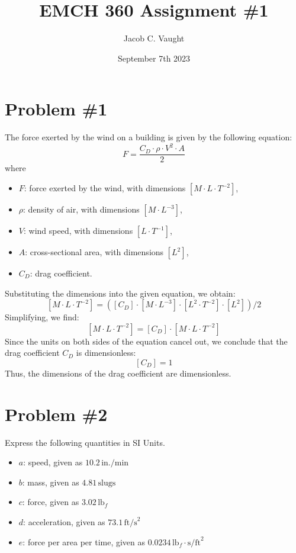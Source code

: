 \documentclass{article}
\title{EMCH 360 Assignment \#1}
\author{Jacob C. Vaught}
\date{September 7th 2023}
\begin{document}
\maketitle

\section*{Problem \#1}
The force exerted by the wind on a building is given by the following equation:
\[
F = \frac{{C_D \cdot \rho \cdot V^2 \cdot A}}{2}
\]
where
\begin{itemize}
\item \( F \): force exerted by the wind, with dimensions \([M \cdot L \cdot T^{-2}]\),
\item \( \rho \): density of air, with dimensions \([M \cdot L^{-3}]\),
\item \( V \): wind speed, with dimensions \([L \cdot T^{-1}]\),
\item \( A \): cross-sectional area, with dimensions \([L^2]\),
\item \( C_D \): drag coefficient.
\end{itemize}
Substituting the dimensions into the given equation, we obtain:
\[
[M \cdot L \cdot T^{-2}] = \left( [C_D] \cdot [M \cdot L^{-3}] \cdot [L^2 \cdot T^{-2}] \cdot [L^2] \right)/2
\]
Simplifying, we find:
\[
[M \cdot L \cdot T^{-2}] = [C_D] \cdot [M \cdot L \cdot T^{-2}]
\]
Since the units on both sides of the equation cancel out, we conclude that the drag coefficient \( C_D \) is dimensionless:
\[
[C_D] = 1
\]
Thus, the dimensions of the drag coefficient are dimensionless.

\newpage %

\section*{Problem \#2}
Express the following quantities in SI Units.

\begin{itemize}
    \item \( a \): speed, given as \(10.2 \, \text{in./min}\)
    \item \( b \): mass, given as \(4.81 \, \text{slugs}\)
    \item \( c \): force, given as \(3.02 \, \text{lb}_f\)
    \item \( d \): acceleration, given as \(73.1 \, \text{ft/s}^2\)
    \item \( e \): force per area per time, given as \(0.0234 \, \text{lb}_f \cdot \text{s/ft}^2\)
\end{itemize}
\end{document}
